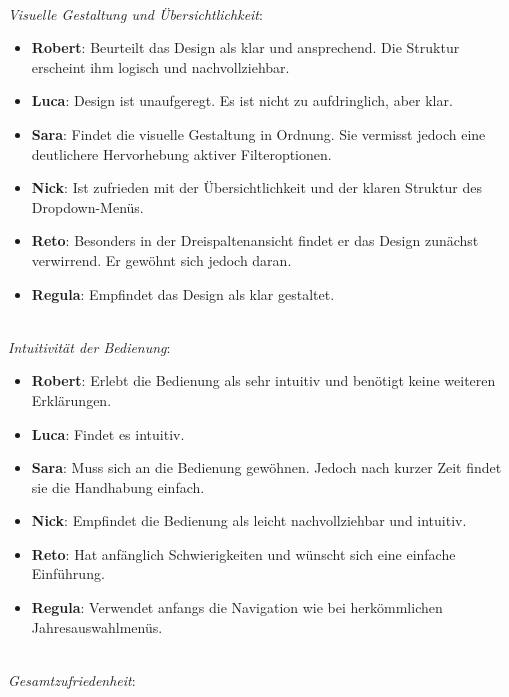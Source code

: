  \\
\emph{Visuelle Gestaltung und Übersichtlichkeit}: 

\begin{itemize}
    \item \textbf{Robert}: 
          Beurteilt das Design als klar und ansprechend. 
          Die Struktur erscheint ihm logisch und nachvollziehbar.
    \item \textbf{Luca}: 
          Design ist unaufgeregt. 
          Es ist nicht zu aufdringlich, aber klar. 
    \item \textbf{Sara}:
          Findet die visuelle Gestaltung in Ordnung. 
          Sie vermisst jedoch eine deutlichere Hervorhebung aktiver Filteroptionen. 
    \item \textbf{Nick}: 
          Ist zufrieden mit der Übersichtlichkeit und der klaren Struktur des Drop\-down-Menüs. 
    \item \textbf{Reto}: 
          Besonders in der Dreispaltenansicht findet er das Design zunächst verwirrend. 
          Er gewöhnt sich jedoch daran.
\item \textbf{Regula}:
Empfindet das Design als klar gestaltet.
\end{itemize}

 \\
\emph{Intuitivität der Bedienung}: 

\begin{itemize}
    \item \textbf{Robert}: 
          Erlebt die Bedienung als sehr intuitiv und benötigt keine weiteren Erklärungen.
    \item \textbf{Luca}: 
          Findet es intuitiv. 
    \item \textbf{Sara}: 
          Muss sich an die Bedienung gewöhnen. 
          Jedoch nach kurzer Zeit findet sie die Handhabung einfach. 
    \item \textbf{Nick}: 
          Empfindet die Bedienung als leicht nachvollziehbar und intuitiv. 
    \item \textbf{Reto}: 
          Hat anfänglich Schwierigkeiten und wünscht sich eine einfache Einführung.
\item \textbf{Regula}:
Verwendet anfangs die Navigation wie bei herkömmlichen Jahresauswahlmenüs.
\end{itemize}

 \\
\emph{Gesamtzufriedenheit}: 

